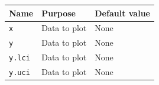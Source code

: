 \documentclass[12pt,a4paper]{book}
\theoremstyle{definition}
\theoremstyle{definition}
\theoremstyle{definition}
\theoremstyle{remark}
\begin{document}
\begin{longtable}[]{@{}lll@{}}
\toprule
\begin{minipage}[b]{0.15\columnwidth}\raggedright
\textbf{Name}\strut
\end{minipage} & \begin{minipage}[b]{0.32\columnwidth}\raggedright
\textbf{Purpose}\strut
\end{minipage} & \begin{minipage}[b]{0.39\columnwidth}\raggedright
\textbf{Default value}\strut
\end{minipage}\tabularnewline
\midrule
\endhead
\begin{minipage}[t]{0.15\columnwidth}\raggedright
\texttt{x}\strut
\end{minipage} & \begin{minipage}[t]{0.32\columnwidth}\raggedright
Data to plot\strut
\end{minipage} & \begin{minipage}[t]{0.39\columnwidth}\raggedright
None\strut
\end{minipage}\tabularnewline
\begin{minipage}[t]{0.15\columnwidth}\raggedright
\texttt{y}\strut
\end{minipage} & \begin{minipage}[t]{0.32\columnwidth}\raggedright
Data to plot\strut
\end{minipage} & \begin{minipage}[t]{0.39\columnwidth}\raggedright
None\strut
\end{minipage}\tabularnewline
\begin{minipage}[t]{0.15\columnwidth}\raggedright
\texttt{y.lci}\strut
\end{minipage} & \begin{minipage}[t]{0.32\columnwidth}\raggedright
Data to plot\strut
\end{minipage} & \begin{minipage}[t]{0.39\columnwidth}\raggedright
None\strut
\end{minipage}\tabularnewline
\begin{minipage}[t]{0.15\columnwidth}\raggedright
\texttt{y.uci}\strut
\end{minipage} & \begin{minipage}[t]{0.32\columnwidth}\raggedright
Data to plot\strut
\end{minipage} & \begin{minipage}[t]{0.39\columnwidth}\raggedright
None\strut
\end{minipage}\tabularnewline

\end{longtable}
\end{document}
